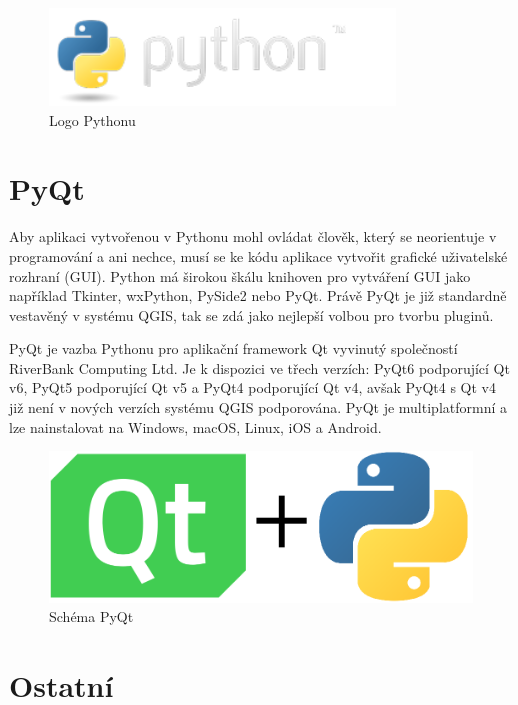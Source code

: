 \begin{figure}[H] \centering
    \includegraphics[width=260pt]{./pictures/python-logo.png}
    \caption[Logo Pythonu]{Logo Pythonu \cite{python}}
	\label{fig:python-logo}                                
\end{figure} 

\section{PyQt}
Aby aplikaci vytvořenou v Pythonu mohl ovládat člověk, který se neorientuje v programování a ani nechce,
musí se ke kódu aplikace vytvořit grafické uživatelské rozhraní (GUI). Python má širokou škálu knihoven
pro vytváření GUI jako například Tkinter, wxPython, PySide2 nebo PyQt. Právě PyQt je již standardně 
vestavěný v systému QGIS, tak se zdá jako nejlepší volbou pro tvorbu pluginů.  

PyQt je vazba Pythonu pro aplikační framework Qt vyvinutý společností RiverBank Computing Ltd.
Je k dispozici ve třech verzích: PyQt6 podporující Qt v6, PyQt5 podporující Qt v5 a PyQt4 podporující Qt v4,
avšak PyQt4 s Qt v4 již není v nových verzích systému QGIS podporována. PyQt je multiplatformní a lze nainstalovat na Windows,
macOS, Linux, iOS a Android. \cite{pyqt}

\begin{figure}[H] \centering
    \includegraphics[width=400pt]{./pictures/pyqt.png}
    \caption[Schéma PyQt Pythonu]{Schéma PyQt}
	\label{fig:pyqt}                                
\end{figure} 

\section{Ostatní}

